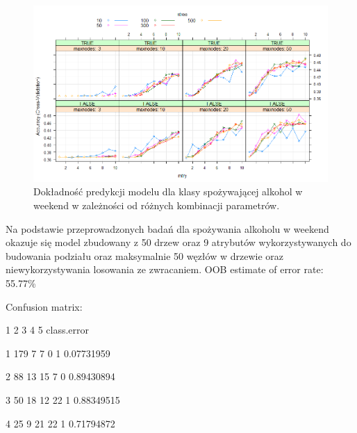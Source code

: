\begin{figure}[h]
     \centering 
     \includegraphics[scale=0.60]{tex/customW_vol4.png}
     \caption{Dokładność predykcji modelu dla klasy spożywającej alkohol w weekend w zależności od różnych kombinacji parametrów.}
     \label{fig:classes}
\end{figure}



Na podstawie przeprowadzonych badań dla spożywania alkoholu w weekend okazuje się model zbudowany z 50 drzew oraz 9 atrybutów wykorzystywanych do  budowania podziału oraz maksymalnie 50 węzłów w drzewie oraz niewykorzystywania losowania ze zwracaniem.
 OOB estimate of  error rate: 55.77\%
 
Confusion matrix:

   1  2  3  4 5 class.error
   
 1 179  7  7  0 1  0.07731959
 
 2  88 13 15  7 0  0.89430894
 
 3  50 18 12 22 1  0.88349515
 
 4  25  9 21 22 1  0.71794872
 
